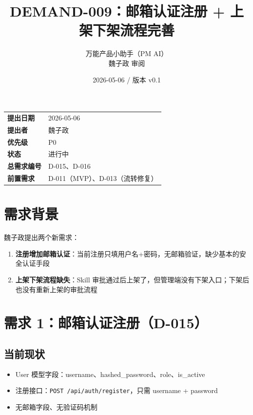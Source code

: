 \documentclass[11pt,a4paper]{article}
\title{\textbf{DEMAND-009：邮箱认证注册 + 上架下架流程完善}}
\author{万能产品小助手（PM AI）\\魏子政 审阅}
\date{2026-05-06 / 版本 v0.1}
\begin{document}
\maketitle

\begin{center}
\begin{tabular}{>{\bfseries}p{3cm} p{10cm}}
\toprule
提出日期 & 2026-05-06 \\
提出者 & 魏子政 \\
优先级 & \textcolor{danger}{P0} \\
状态 & \textcolor{progress}{进行中} \\
总需求编号 & D-015、D-016 \\
前置需求 & D-011（MVP）、D-013（流转修复） \\
\bottomrule
\end{tabular}
\end{center}

\vspace{1em}

\section{需求背景}

魏子政提出两个新需求：

\begin{enumerate}[nosep]
  \item \textbf{注册增加邮箱认证}：当前注册只填用户名+密码，无邮箱验证，缺少基本的安全认证手段
  \item \textbf{上架下架流程缺失}：Skill 审批通过后上架了，但管理端没有下架入口；下架后也没有重新上架的审批流程
\end{enumerate}

\section{需求 1：邮箱认证注册（D-015）}

\subsection{当前现状}

\begin{itemize}[nosep]
  \item User 模型字段：username、hashed\_password、role、is\_active
  \item 注册接口：\texttt{POST /api/auth/register}，只需 username + password
  \item 无邮箱字段、无验证码机制
\end{itemize}
\end{document}
